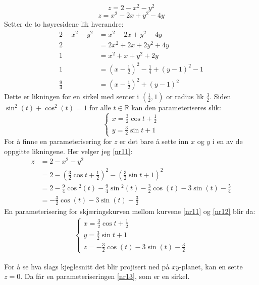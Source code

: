 \documentclass[11pt, a4paper, norsk]{NTNUoving}
\begin{document}
\begin{oppgave}
    \begin{equation}
        z = 2 - x^2 -y^2
        \label{nr11}
    \end{equation}
    \begin{equation}
        z = x^2 -2x +y^2 -4y
        \label{nr12}
    \end{equation}
    Setter de to høyresidene lik hverandre:
    \begin{align*}
        2 - x^2 -y^2 &= x^2 -2x +y^2 -4y\\
        2 &= 2x^2 + 2x + 2y^2 + 4y\\
        1 &= x^2 + x + y^2 + 2y\\
        1 &= \left(x- \frac{1}{2}\right)^2 - \frac{1}{4} + (y-1)^2 -1\\
        \frac{9}{4} &= \left(x- \frac{1}{2}\right)^2 + (y-1)^2
    \end{align*}
    Dette er likningen for en sirkel med senter i $(\frac{1}{2}, 1)$ or radius lik $\frac{3}{2}$. Siden $\sin^2(t)+\cos^2(t) = 1$ for alle $t \in \mathbb{R}$ kan den parameteriseres slik:
    \begin{equation}
        \begin{cases}
            x=\frac{3}{2}\cos{t}+\frac{1}{2}\\
            y=\frac{3}{2}\sin{t}+1
        \end{cases}
        \label{nr13}
    \end{equation}
    For å finne en parameterisering for $z$ er det bare å sette inn $x$ og $y$ i en av de oppgitte likningene. Her velger jeg \eqref{nr11}:
    \begin{align*}
        z &= 2 - x^2 -y^2
        \\&= 2 - \left(\frac{3}{2}\cos{t}+\frac{1}{2}\right)^2 - \left(\frac{3}{2}\sin{t} + 1\right)^2
        \\&= 2 - \frac{9}{4}\cos{^2(t)} - \frac{9}{4}\sin{^2(t)}- \frac{3}{2}\cos{(t)} - 3\sin{(t)} - \frac{5}{4}
        \\&= -\frac{3}{2}\cos{(t)} - 3\sin{(t)} - \frac{3}{2}
    \end{align*}
    En parameterisering for skjæringskurven mellom kurvene \eqref{nr11} og \eqref{nr12} blir da:
    \begin{align*}
        \begin{cases}
            x=\frac{3}{2}\cos{t}+\frac{1}{2}\\
            y=\frac{3}{2}\sin{t}+1\\
            z= -\frac{3}{2}\cos{(t)} - 3\sin{(t)} - \frac{3}{2}
        \end{cases}
    \end{align*}
    
    For å se hva slags kjeglesnitt det blir projisert ned på $xy$-planet, kan en sette $z=0$. Da får en parameteriseringen \eqref{nr13}, som er en sirkel.
\end{oppgave}
\end{document}
